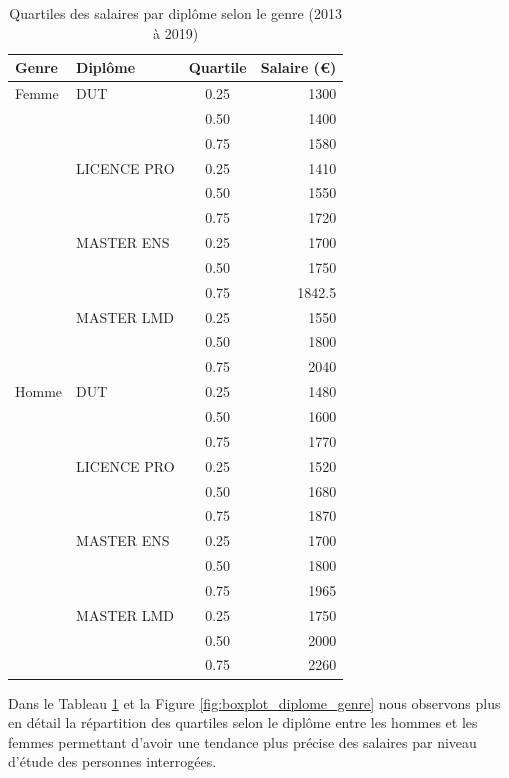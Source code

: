 \documentclass[12pt, a4paper, titlepage, table]{article}
\begin{document}
	
	\begin{table}[H]
		\centering
		\begin{tabular}{llcr}
			\toprule
			\textbf{Genre} & \textbf{Diplôme} & \textbf{Quartile} & \textbf{Salaire (€)} \\
			\midrule
			Femme & DUT & 0.25 & 1300 \\
			&     & 0.50 & 1400 \\
			&     & 0.75 & 1580 \\
			\cmidrule{2-4}
			& LICENCE PRO & 0.25 & 1410 \\
			&             & 0.50 & 1550 \\
			&             & 0.75 & 1720 \\
			\cmidrule{2-4}
			& MASTER ENS & 0.25 & 1700 \\
			&            & 0.50 & 1750 \\
			&            & 0.75 & 1842.5 \\
			\cmidrule{2-4}
			& MASTER LMD & 0.25 & 1550 \\
			&            & 0.50 & 1800 \\
			&            & 0.75 & 2040 \\
			\midrule
			Homme & DUT & 0.25 & 1480 \\
			&     & 0.50 & 1600 \\
			&     & 0.75 & 1770 \\
			\cmidrule{2-4}
			& LICENCE PRO & 0.25 & 1520 \\
			&             & 0.50 & 1680 \\
			&             & 0.75 & 1870 \\
			\cmidrule{2-4}
			& MASTER ENS & 0.25 & 1700 \\
			&            & 0.50 & 1800 \\
			&            & 0.75 & 1965 \\
			\cmidrule{2-4}
			& MASTER LMD & 0.25 & 1750 \\
			&            & 0.50 & 2000 \\
			&            & 0.75 & 2260 \\
			\bottomrule
		\end{tabular}
		\caption{Quartiles des salaires par diplôme selon le genre (2013 à 2019)}
		\label{tab:quartile_values_diplome}
	\end{table}
	
	Dans le Tableau \ref{tab:quartile_values_diplome} et la Figure \ref{fig:boxplot_diplome_genre} nous observons plus en détail la répartition des quartiles selon le diplôme entre les hommes et les femmes permettant d'avoir une tendance plus précise des salaires par niveau d'étude des personnes interrogées. 
	
\end{document}
